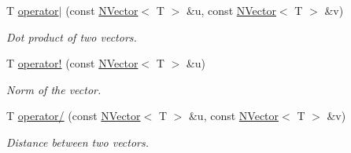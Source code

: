 \begin{Indent}
\begin{DoxyCompactItemize}
T \mbox{\hyperlink{class_n_vector_a193c63fac7e6b9528c854fd94ee76030}{operator$\vert$}} (const \mbox{\hyperlink{class_n_vector}{N\+Vector}}$<$ T $>$ \&u, const \mbox{\hyperlink{class_n_vector}{N\+Vector}}$<$ T $>$ \&v)
\begin{DoxyCompactList}\small\item\em Dot product of two vectors. \end{DoxyCompactList}\item 
T \mbox{\hyperlink{class_n_vector_a697b7e9e059d8045dc5f682f94521548}{operator!}} (const \mbox{\hyperlink{class_n_vector}{N\+Vector}}$<$ T $>$ \&u)
\begin{DoxyCompactList}\small\item\em Norm of the vector. \end{DoxyCompactList}\item 
T \mbox{\hyperlink{class_n_vector_a28eb7e90bdbd558f19beb9faebb1de1f}{operator/}} (const \mbox{\hyperlink{class_n_vector}{N\+Vector}}$<$ T $>$ \&u, const \mbox{\hyperlink{class_n_vector}{N\+Vector}}$<$ T $>$ \&v)
\begin{DoxyCompactList}\small\item\em Distance between two vectors. \end{DoxyCompactList}\end{DoxyCompactItemize}
\end{Indent}
